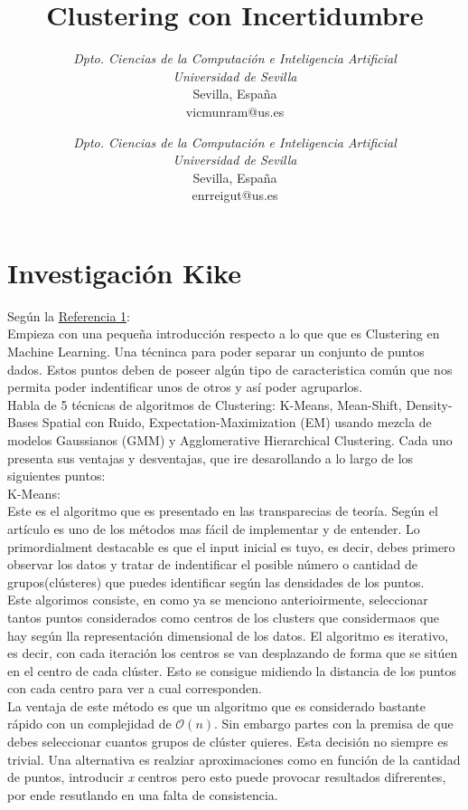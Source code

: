 \documentclass[conference,a4paper]{IEEEtran}
\title{Clustering con Incertidumbre}
\author
{
	\IEEEauthorblockN{Víctor Muñoz Ramírez}
	\IEEEauthorblockA
	{
		\textit{Dpto. Ciencias de la Computación e Inteligencia Artificial}\\
		\textit{Universidad de Sevilla}\\
		Sevilla, España\\
		vicmunram@us.es
	}
	\and	
	\IEEEauthorblockN{Enrique Reina Gutiérrez}
	\IEEEauthorblockA
	{
		\textit{Dpto. Ciencias de la Computación e Inteligencia Artificial}\\
		\textit{Universidad de Sevilla}\\
		Sevilla, España\\
		enrreigut@us.es
	}
}
\begin{document}
\maketitle


\section{Investigación Kike}

Según la  \hyperref[bib:georgeSeif]{Referencia 1}: \\ 

Empieza con una pequeña introducción respecto a  lo que que es Clustering en Machine Learning. Una técninca para poder separar un conjunto de puntos dados. Estos puntos deben de poseer algún tipo de caracteristica común que nos permita poder indentificar unos de otros y así poder agruparlos.\\

Habla de 5 técnicas de algoritmos de Clustering: K-Means, Mean-Shift, Density-Bases Spatial con Ruido, Expectation-Maximization (EM) usando mezcla de modelos Gaussianos (GMM) y Agglomerative Hierarchical Clustering. Cada uno presenta sus ventajas y desventajas, que ire desarollando a lo largo de los siguientes puntos:\\

K-Means:\\

Este es el algoritmo que es presentado en las transparecias de teoría. Según el artículo es uno de los métodos mas fácil de implementar y de entender.  Lo primordialment destacable es que el input inicial es tuyo, es decir, debes primero observar los datos y tratar de indentificar el posible número o cantidad  de grupos(clústeres) que puedes identificar según las densidades de los puntos.\\

Este algorimos consiste, en como ya se menciono anterioirmente, seleccionar tantos puntos considerados como centros de los clusters que considermaos que hay según lla representación dimensional de los datos. El algoritmo es iterativo, es decir, con cada iteración los centros se van desplazando de forma que se sitúen en el centro de cada clúster. Esto se consigue midiendo la distancia de los puntos con cada centro para ver a cual corresponden.\\

La ventaja de este método es que un algoritmo que es considerado bastante rápido con un complejidad de $\mathcal{O}(n)$. Sin embargo partes con la premisa de que debes seleccionar cuantos grupos de clúster quieres. Esta decisión no siempre es trivial. Una alternativa es realziar aproximaciones como en función de la cantidad de puntos,  introducir \textit{x} centros pero esto puede provocar resultados difrerentes, por ende resutlando en una falta de consistencia.\\
\end{document}
